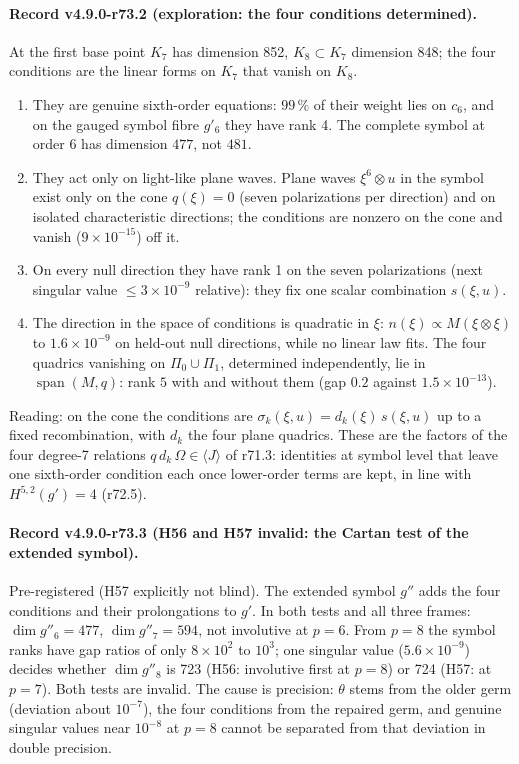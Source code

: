 \paragraph{Record v4.9.0-r73.2 (exploration: the four conditions determined).}
At the first base point \(K_7\) has dimension 852, \(K_8\subset K_7\) dimension 848; the four conditions are the linear forms on
\(K_7\) that vanish on \(K_8\).
\begin{enumerate}[leftmargin=2em]
\item[(a)] They are genuine sixth-order equations: \(99\,\%\) of their weight lies on \(c_6\), and on the gauged symbol fibre
\(g'_6\) they have rank 4.  The complete symbol at order 6 has dimension \(477\), not \(481\).
\item[(b)] They act only on light-like plane waves.  Plane waves \(\xi^6\otimes u\) in the symbol exist only on the cone
\(q(\xi)=0\) (seven polarizations per direction) and on isolated characteristic directions; the conditions are nonzero on the
cone and vanish (\(9\times10^{-15}\)) off it.
\item[(c)] On every null direction they have rank 1 on the seven polarizations (next singular value \(\le3\times10^{-9}\)
relative): they fix one scalar combination \(s(\xi,u)\).
\item[(d)] The direction in the space of conditions is quadratic in \(\xi\): \(n(\xi)\propto M(\xi\otimes\xi)\) to
\(1.6\times10^{-9}\) on held-out null directions, while no linear law fits.  The four quadrics vanishing on
\(\Pi_0\cup\Pi_1\), determined independently, lie in \(\operatorname{span}(M,q)\): rank \(5\) with and without them (gap
\(0.2\) against \(1.5\times10^{-13}\)).
\end{enumerate}
Reading: on the cone the conditions are \(\sigma_k(\xi,u)=d_k(\xi)\,s(\xi,u)\) up to a fixed recombination, with \(d_k\) the
four plane quadrics.  These are the factors of the four degree-7 relations \(q\,d_k\,\Omega\in\langle J\rangle\) of r71.3:
identities at symbol level that leave one sixth-order condition each once lower-order terms are kept, in line with
\(H^{5,2}(g')=4\) (r72.5).

\paragraph{Record v4.9.0-r73.3 (H56 and H57 invalid: the Cartan test of the extended symbol).}
Pre-registered (H57 explicitly not blind).  The extended symbol \(g''\) adds the four conditions and their prolongations to
\(g'\).  In both tests and all three frames: \(\dim g''_6=477\), \(\dim g''_7=594\), not involutive at \(p=6\).  From \(p=8\)
the symbol ranks have gap ratios of only \(8\times10^2\) to \(10^3\); one singular value (\(5.6\times10^{-9}\)) decides whether
\(\dim g''_8\) is 723 (H56: involutive first at \(p=8\)) or 724 (H57: at \(p=7\)).  Both tests are invalid.  The cause is
precision: \(\theta\) stems from the older germ (deviation about \(10^{-7}\)), the four conditions from the repaired germ, and
genuine singular values near \(10^{-8}\) at \(p=8\) cannot be separated from that deviation in double precision.

